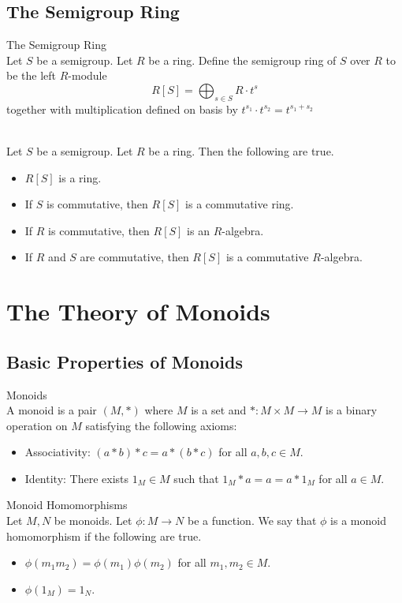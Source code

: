 \documentclass[a4paper]{article}
\begin{document}
\subsection{The Semigroup Ring}
\begin{defn}{The Semigroup Ring}{}\\
Let $S$ be a semigroup. Let $R$ be a ring. Define the semigroup ring of $S$ over $R$ to be the left $R$-module $$R[S]=\bigoplus_{s\in S}R\cdot t^s$$ together with multiplication defined on basis by $t^{s_1}\cdot t^{s_2}=t^{s_1+s_2}$
\end{defn}

\begin{lmm}{}{}\\
Let $S$ be a semigroup. Let $R$ be a ring. Then the following are true. 
\begin{itemize}
\item $R[S]$ is a ring. 
\item If $S$ is commutative, then $R[S]$ is a commutative ring. 
\item If $R$ is commutative, then $R[S]$ is an $R$-algebra. 
\item If $R$ and $S$ are commutative, then $R[S]$ is a commutative $R$-algebra. 
\end{itemize}
\end{lmm}

\pagebreak
\section{The Theory of Monoids}
\subsection{Basic Properties of Monoids}
\begin{defn}{Monoids}{}\\
A monoid is a pair $(M,\ast)$ where $M$ is a set and $\ast:M\times M\to M$ is a binary operation on $M$ satisfying the following axioms: 
\begin{itemize}
\item Associativity: $(a\ast b)\ast c=a\ast(b\ast c)$ for all $a,b,c\in M$. 
\item Identity: There exists $1_M\in M$ such that $1_M\ast a=a=a\ast 1_M$ for all $a\in M$. 
\end{itemize}
\end{defn}

\begin{defn}{Monoid Homomorphisms}{}\\
Let $M,N$ be monoids. Let $\phi:M\to N$ be a function. We say that $\phi$ is a monoid homomorphism if the following are true. 
\begin{itemize}
\item $\phi(m_1m_2)=\phi(m_1)\phi(m_2)$ for all $m_1,m_2\in M$. 
\item $\phi(1_M)=1_N$. 
\end{itemize}
\end{defn}
\end{document}
